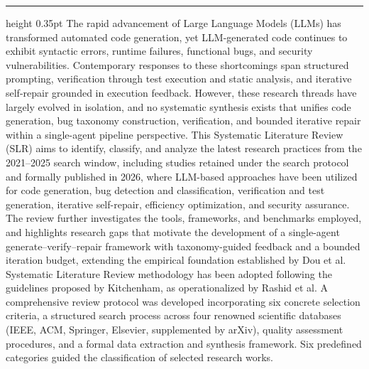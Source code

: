 \documentclass[10pt,a4paper]{article}
\newenvironment{topminipage}[1]{\begin{minipage}[t]{#1}}{\end{minipage}}
\begin{document}
\begin{topminipage}{0.70\textwidth}
\vspace{0pt}
{\small\bfseries{}\par}
\vspace{0.45em}
\hrule height 0.35pt
\vspace{0.5em}
{\fontsize{8.2}{9.7}\selectfont
\noindent
The rapid advancement of Large Language Models (LLMs) has transformed automated code generation, yet LLM-generated code continues to exhibit syntactic errors, runtime failures, functional bugs, and security vulnerabilities. Contemporary responses to these shortcomings span structured prompting, verification through test execution and static analysis, and iterative self-repair grounded in execution feedback. However, these research threads have largely evolved in isolation, and no systematic synthesis exists that unifies code generation, bug taxonomy construction, verification, and bounded iterative repair within a single-agent pipeline perspective.
\noindent
This Systematic Literature Review (SLR) aims to identify, classify, and analyze the latest research practices from the 2021--2025 search window, including studies retained under the search protocol and formally published in 2026, where LLM-based approaches have been utilized for code generation, bug detection and classification, verification and test generation, iterative self-repair, efficiency optimization, and security assurance. The review further investigates the tools, frameworks, and benchmarks employed, and highlights research gaps that motivate the development of a single-agent generate--verify--repair framework with taxonomy-guided feedback and a bounded iteration budget, extending the empirical foundation established by Dou et al.
\noindent
Systematic Literature Review methodology has been adopted following the guidelines proposed by Kitchenham, as operationalized by Rashid et al. A comprehensive review protocol was developed incorporating six concrete selection criteria, a structured search process across four renowned scientific databases (IEEE, ACM, Springer, Elsevier, supplemented by arXiv), quality assessment procedures, and a formal data extraction and synthesis framework. Six predefined categories guided the classification of selected research works.
\noindent
}
\end{topminipage}
\end{document}

